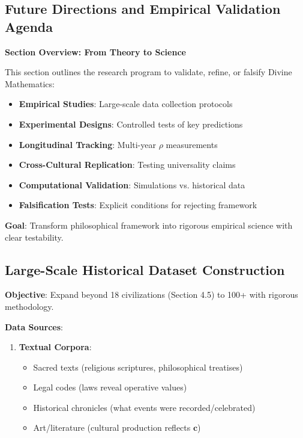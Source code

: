 \documentclass[11pt,a4paper]{article}
\theoremstyle{definition}
\theoremstyle{remark}
\newcommand{\cc}{\mathbf{c}}
\begin{document}
\begin{small}
\begin{enumerate}
\section{Future Directions and Empirical Validation Agenda}

\begin{mdframed}[backgroundcolor=cyan!5,linewidth=2pt]
\textbf{Section Overview: From Theory to Science}

This section outlines the research program to validate, refine, or falsify Divine Mathematics:

\begin{itemize}[nosep]
    \item \textbf{Empirical Studies}: Large-scale data collection protocols
    \item \textbf{Experimental Designs}: Controlled tests of key predictions
    \item \textbf{Longitudinal Tracking}: Multi-year \(\rho\) measurements
    \item \textbf{Cross-Cultural Replication}: Testing universality claims
    \item \textbf{Computational Validation}: Simulations vs. historical data
    \item \textbf{Falsification Tests}: Explicit conditions for rejecting framework
\end{itemize}

\textbf{Goal}: Transform philosophical framework into rigorous empirical science with clear testability.
\end{mdframed}

\subsection{Large-Scale Historical Dataset Construction}

\begin{protocol}
\textbf{Objective}: Expand beyond 18 civilizations (Section 4.5) to 100+ with rigorous methodology.

\textbf{Data Sources}:
\begin{enumerate}
    \item \textbf{Textual Corpora}:
        \begin{itemize}[nosep]
            \item Sacred texts (religious scriptures, philosophical treatises)
            \item Legal codes (laws reveal operative values)
            \item Historical chronicles (what events were recorded/celebrated)
            \item Art/literature (cultural production reflects \(\cc\))
        \end{itemize}
    

\end{enumerate}
\end{protocol}
\end{enumerate}
\end{small}
\end{document}
